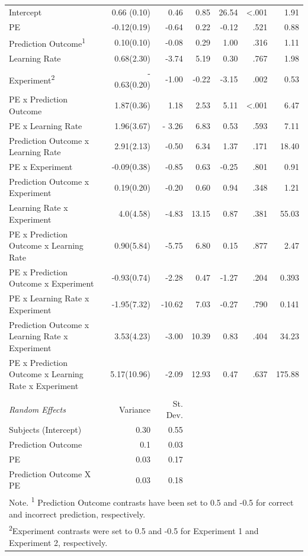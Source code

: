 \documentclass[a4paper,12pt]{article}
\begin{document}
\begin{landscape}
\begin{table}
{\begin{tabular} {l r r r r r r}
  Intercept & 0.66 (0.10) & 0.46 & 0.85 & 26.54 & <.001 & 1.91\\
  PE & -0.12(0.19) & -0.64 & 0.22 & -0.12 & .521 & 0.88 \\
  Prediction Outcome\textsuperscript{1}  & 0.10(0.10) & -0.08 & 0.29 & 1.00 & .316 & 1.11 \\
  Learning Rate  & 0.68(2.30) & -3.74 & 5.19 & 0.30 & .767 & 1.98 \\
  Experiment\textsuperscript{2} & - 0.63(0.20) & -1.00 & -0.22 & -3.15 & .002 & 0.53 \\
  PE x Prediction Outcome & 1.87(0.36) & 1.18 & 2.53 & 5.11 & <.001 & 6.47 \\
  PE x Learning Rate & 1.96(3.67) & - 3.26 & 6.83 & 0.53 & .593 & 7.11 \\
  Prediction Outcome x Learning Rate & 2.91(2.13) & -0.50 & 6.34 & 1.37 & .171 & 18.40 \\
  PE x Experiment & -0.09(0.38) & -0.85 & 0.63  & -0.25 & .801 & 0.91 \\
  Prediction Outcome x Experiment & 0.19(0.20) & -0.20 & 0.60 & 0.94 & .348 & 1.21 \\
  Learning Rate x Experiment & 4.0(4.58) & -4.83 & 13.15 & 0.87 & .381 & 55.03 \\
  PE x Prediction Outcome x Learning Rate & 0.90(5.84) & -5.75 & 6.80 & 0.15 & .877 & 2.47 \\
  PE x Prediction Outcome x Experiment & -0.93(0.74) & -2.28 & 0.47 & -1.27 & .204 & 0.393 \\
  PE x Learning Rate x Experiment & -1.95(7.32) & -10.62 & 7.03 &  -0.27 & .790 & 0.141 \\
  Prediction Outcome x Learning Rate x Experiment & 3.53(4.23) & -3.00 & 10.39 & 0.83 & .404 & 34.23 \\
  PE x Prediction Outcome x Learning Rate x Experiment & 5.17(10.96) &  -2.09 & 12.93 & 0.47 & .637 & 175.88 \\
& & & & & &  \\
  \textit{ Random Effects} & Variance  & St. Dev.\\\cmidrule{1-3}
Subjects (Intercept) & 0.30 & 0.55 \\
Prediction Outcome & 0.1 & 0.03 \\
PE & 0.03 & 0.17 \\
Prediction Outcome X PE & 0.03 & 0.18 \\
\bottomrule
\multicolumn{7}{l}{\footnotesize Note. \textsuperscript{1} Prediction Outcome contrasts have been set to 0.5 and -0.5 for correct and incorrect prediction, respectively.}\\
\multicolumn{7}{l}{\footnotesize \textsuperscript{2}Experiment contrasts were set to 0.5 and -0.5 for Experiment 1 and Experiment 2, respectively.}

    \end{tabular}
}
\label{tab:Main}

    \end{table}

\end{landscape}
\end{document}
